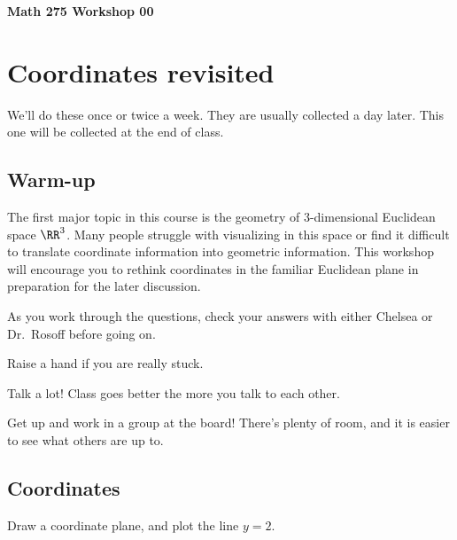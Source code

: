 \documentclass[12pt]{exam}
\begin{document}
\noindent
\textbf{{\large Math 275 \hfill Workshop 00}}

\noindent
{}

\noindent
{} 

\section{Coordinates revisited}

We'll do these once or twice a week. They are usually collected a
day later. This one will be collected at the end of class.

\subsection{Warm-up}

The first major topic in this course is the geometry of 3-dimensional
Euclidean space $\RR^3$. Many people struggle with visualizing in
this space or find it difficult to translate coordinate information into
geometric information. This workshop will encourage you to rethink
coordinates in the familiar Euclidean plane in preparation for the later
discussion.

\begin{compactitem}
    \item As you work through the questions, check your answers with either Chelsea or Dr.\ Rosoff before going on. 
    \item Raise a hand if you are really stuck. 
    \item Talk a lot! Class goes better the more you talk to each other.
    \item Get up and work in a group at the board! There's plenty of room, 
    and it is easier to see what others are up to.
\end{compactitem}

\subsection{Coordinates}

Draw a coordinate plane, and plot the line $y = 2$.
\end{document}
